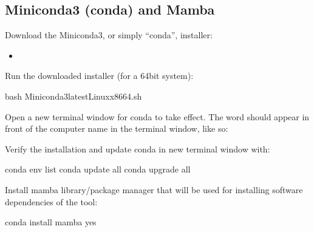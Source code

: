 \documentclass[letterpaper,10pt,english]{sphinxhowto}
\begin{document}
\subsection{Miniconda3 (conda) and Mamba}
\label{\detokenize{index:miniconda3-conda-and-mamba}}
\sphinxAtStartPar
Download the Miniconda3, or simply “conda”, installer:
\begin{itemize}
\item {} 
\sphinxAtStartPar
{}

\end{itemize}

\sphinxAtStartPar
Run the downloaded installer (for a 64\sphinxhyphen{}bit system):

\begin{sphinxVerbatim}[commandchars=\\\{\}]
\PYGZdl{} bash Miniconda3\PYGZhy{}latest\PYGZhy{}Linux\PYGZhy{}x86\PYGZus{}64.sh
\end{sphinxVerbatim}

\sphinxAtStartPar
Open a new terminal window for conda to take effect. The word  should appear in front of the computer name in the terminal window, like so:

\begin{figure}[htbp]
\centering

\noindent{}
\end{figure}

\begin{figure}[htbp]
\centering

\noindent{}
\end{figure}

\sphinxAtStartPar
Verify the installation and update conda in new terminal window with:

\begin{sphinxVerbatim}[commandchars=\\\{\}]
\PYGZdl{} conda env list
\PYGZdl{} conda update \PYGZhy{}\PYGZhy{}all
\PYGZdl{} conda upgrade \PYGZhy{}\PYGZhy{}all
\end{sphinxVerbatim}

\sphinxAtStartPar
Install mamba library/package manager that will be used for installing software dependencies of the tool:

\begin{sphinxVerbatim}[commandchars=\\\{\}]
\PYGZdl{} conda install mamba \PYGZhy{}\PYGZhy{}yes
\end{sphinxVerbatim}
\end{document}
